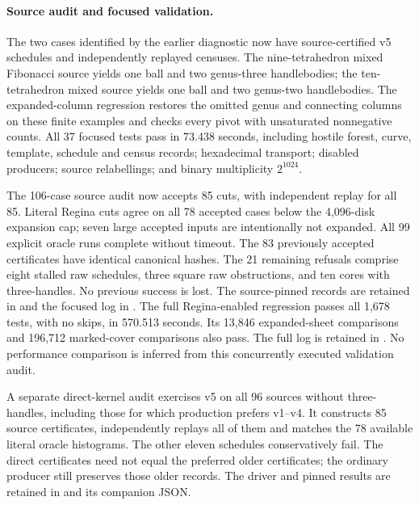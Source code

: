 \paragraph{Source audit and focused validation.}
The two cases identified by the earlier diagnostic now have source-certified
v5 schedules and independently replayed censuses. The nine-tetrahedron mixed
Fibonacci source yields one ball and two genus-three handlebodies; the
ten-tetrahedron mixed source yields one ball and two genus-two handlebodies.
The expanded-column regression restores the omitted genus and connecting
columns on these finite examples and checks every pivot with unsaturated
nonnegative counts. All 37 focused tests pass in 73.438 seconds, including hostile forest,
curve, template, schedule and census records; hexadecimal transport;
disabled producers; source relabellings; and binary multiplicity $2^{1024}$.

The 106-case source audit now accepts 85 cuts, with independent replay for
all 85. Literal Regina cuts agree on all 78 accepted cases below the
4,096-disk expansion cap; seven large accepted inputs are intentionally not
expanded. All 99 explicit oracle runs complete without timeout. The 83
previously accepted certificates have identical canonical hashes. The 21
remaining refusals comprise eight stalled raw schedules, three square raw
obstructions, and ten cores with three-handles. No previous success is lost.
The source-pinned records are retained in 
and the focused log in .
The full Regina-enabled regression passes all 1,678 tests, with no skips,
in 570.513 seconds. Its 13,846 expanded-sheet comparisons and 196,712
marked-cover comparisons also pass. The full log is retained in
. No performance comparison is inferred
from this concurrently executed validation audit.

A separate direct-kernel audit exercises v5 on all 96 sources without
three-handles, including those for which production prefers v1--v4. It
constructs 85 source certificates, independently replays all of them and
matches the 78 available literal oracle histograms. The other eleven
schedules conservatively fail. The direct certificates need not equal the
preferred older certificates; the ordinary producer still preserves those
older records. The driver and pinned results are retained in
 and its companion JSON.

